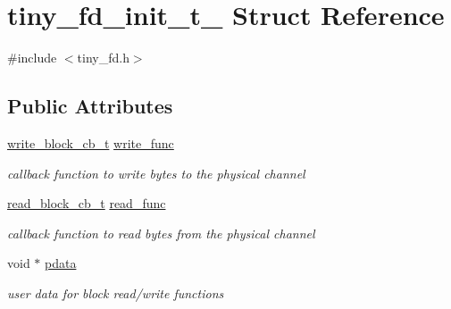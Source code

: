\hypertarget{structtiny__fd__init__t__}{}\section{tiny\+\_\+fd\+\_\+init\+\_\+t\+\_\+ Struct Reference}
\label{structtiny__fd__init__t__}


{\ttfamily \#include $<$tiny\+\_\+fd.\+h$>$}

\subsection*{Public Attributes}
\begin{DoxyCompactItemize}
\item 
\mbox{\label{structtiny__fd__init__t___a09606a8bdc239aeb3744a63f48585844}} 
\hyperlink{tiny__types_8h_aafd634660bba76cace57a8f9b01e044d}{write\+\_\+block\+\_\+cb\+\_\+t} \hyperlink{structtiny__fd__init__t___a09606a8bdc239aeb3744a63f48585844}{write\+\_\+func}
\begin{DoxyCompactList}\small\item\em callback function to write bytes to the physical channel \end{DoxyCompactList}\item 
\mbox{\label{structtiny__fd__init__t___a5b241b958dbbc00dc8d5a6457ea61ed0}} 
\hyperlink{tiny__types_8h_a15bec127d9ee63658563d62e92b5261b}{read\+\_\+block\+\_\+cb\+\_\+t} \hyperlink{structtiny__fd__init__t___a5b241b958dbbc00dc8d5a6457ea61ed0}{read\+\_\+func}
\begin{DoxyCompactList}\small\item\em callback function to read bytes from the physical channel \end{DoxyCompactList}\item 
\mbox{\label{structtiny__fd__init__t___ac5e99328c76e8c11f98f1f9c911bde6e}} 
void $\ast$ \hyperlink{structtiny__fd__init__t___ac5e99328c76e8c11f98f1f9c911bde6e}{pdata}
\begin{DoxyCompactList}\small\item\em user data for block read/write functions \end{DoxyCompactList}\item 
\mbox{\label{structtiny__fd__init__t___a437d94ac2f58ea83f510e0a35733f3a1}} 

\end{DoxyCompactItemize}
